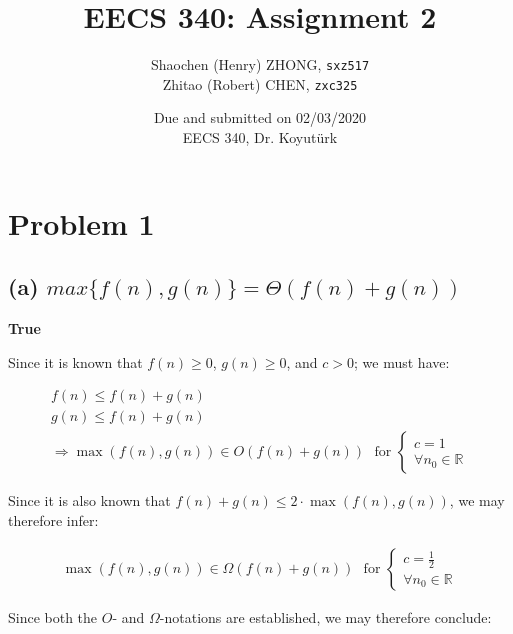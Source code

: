 \documentclass[12pt]{article}
\newcommand{\inlinecode}{\texttt}
\begin{document}
\title{\textbf{EECS 340: Assignment 2}}

\author{Shaochen (Henry) ZHONG, \inlinecode{sxz517} \\ Zhitao (Robert) CHEN, \inlinecode{zxc325}}
\date{Due and submitted on 02/03/2020 \\ EECS 340, Dr. Koyut{\"u}rk}
\maketitle

\section{Problem 1}

\subsection{(a) $max\{f(n), g(n)\} = \Theta (f(n) + g(n))$}
\textbf{True}


Since it is known that $f(n) \geq 0$, $g(n) \geq 0$, and $c > 0$; we must have:

\begin{gather}
    f(n) \leq f(n) + g(n) \nonumber\\
    g(n) \leq f(n) + g(n) \nonumber\\
    \Rightarrow \max(f(n), g(n)) \in O(f(n) + g(n)) \ \ \ \text{for } \begin{cases}
                    c = 1 \\
                    \forall{n_{0}} \in \mathbb{R}
                \end{cases}
\end{gather}

Since it is also known that $f(n) + g(n) \leq 2 \cdot \max(f(n),g(n))$, we may therefore infer:

\begin{gather}
    \max(f(n), g(n)) \in \Omega(f(n) + g(n)) \ \ \ \text{for } \begin{cases}
        c = \frac{1}{2} \\
        \forall{n_{0}} \in \mathbb{R}
    \end{cases}
\end{gather}

Since both the $O$- and $\Omega$-notations are established, we may therefore conclude:
\end{document}
